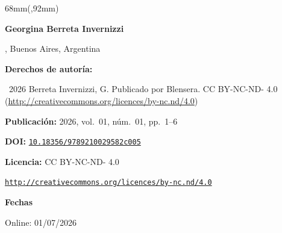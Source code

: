 \begin{textblock*}{68mm}(\gbbloquex,92mm)
{\setlength{\leftskip}{0pt}\setlength{\parindent}{0pt}%
\noindent\begin{minipage}[t]{68mm}
\sffamily\small\setlength{\parskip}{1pt}
{\bfseries\color{azulrevista}Georgina Berreta Invernizzi}\par
, Buenos Aires, Argentina\par
\vspace{6pt}
{\bfseries\color{azulrevista!70}Derechos de autor\'ia:}\par
\textcopyright\ 2026 Berreta Invernizzi, G. Publicado por Blensera. CC BY-NC-ND- 4.0 (\href{http://creativecommons.org/licences/by-nc.nd/4.0}{http://creativecommons.org/licences/by-nc.nd/4.0})\par\vspace{6pt}
{\bfseries\color{azulrevista!70}Publicación:} 2026, vol.~01, n\'um.~01, pp.~1--6\par\vspace{6pt}
{\bfseries\color{azulrevista!70}DOI:} {\scriptsize\texttt{\href{https://doi.org/10.18356/9789210029582c005}{10.18356/9789210029582c005}}}\par\vspace{6pt}
{\bfseries\color{azulrevista!70}Licencia:} CC BY-NC-ND- 4.0\par
{\scriptsize\texttt{\href{http://creativecommons.org/licences/by-nc.nd/4.0}{http://creativecommons.org/licences/by-nc.nd/4.0}}}\par
\vspace{6pt}
{\bfseries\color{azulrevista!70}Fechas}\par\vspace{2pt}
Online: 01/07/2026\par
\vspace{6pt}
\end{minipage}%
}%
\end{textblock*}


